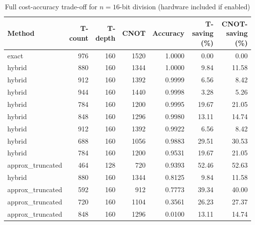 \begin{table}[ht]
\centering
\small
\begin{tabular}{lrrrrrr}
\toprule
Method & T-count & T-depth & CNOT & Accuracy & T-saving (\%) & CNOT-saving (\%) \\
\midrule
exact & 976 & 160 & 1520 & 1.0000 & 0.00 & 0.00 \\
\midrule
hybrid & 880 & 160 & 1344 & 1.0000 & 9.84 & 11.58 \\
hybrid & 912 & 160 & 1392 & 0.9999 & 6.56 & 8.42 \\
hybrid & 944 & 160 & 1440 & 0.9998 & 3.28 & 5.26 \\
hybrid & 784 & 160 & 1200 & 0.9995 & 19.67 & 21.05 \\
hybrid & 848 & 160 & 1296 & 0.9980 & 13.11 & 14.74 \\
hybrid & 912 & 160 & 1392 & 0.9922 & 6.56 & 8.42 \\
hybrid & 688 & 160 & 1056 & 0.9883 & 29.51 & 30.53 \\
hybrid & 784 & 160 & 1200 & 0.9531 & 19.67 & 21.05 \\
\midrule
approx_truncated & 464 & 128 & 720 & 0.9393 & 52.46 & 52.63 \\
\midrule
hybrid & 880 & 160 & 1344 & 0.8125 & 9.84 & 11.58 \\
\midrule
approx_truncated & 592 & 160 & 912 & 0.7773 & 39.34 & 40.00 \\
approx_truncated & 720 & 160 & 1104 & 0.3561 & 26.23 & 27.37 \\
approx_truncated & 848 & 160 & 1296 & 0.0100 & 13.11 & 14.74 \\
\bottomrule
\end{tabular}
\caption{Full cost-accuracy trade-off for $n=16$-bit division (hardware included if enabled)}
\label{tab:tradeoff}
\end{table}